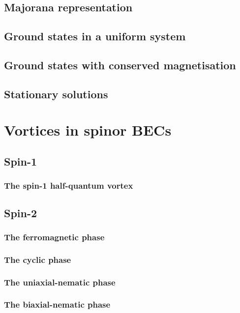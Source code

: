 \subsection{Majorana representation}

\subsection{Ground states in a uniform system}

\subsection{Ground states with conserved magnetisation}

\subsection{Stationary solutions}

\section{Vortices in spinor BECs}

\subsection{Spin-1}
\subsubsection{The spin-1 half-quantum vortex}

\subsection{Spin-2}

\subsubsection{The ferromagnetic phase}
\subsubsection{The cyclic phase}
\subsubsection{The uniaxial-nematic phase}
\subsubsection{The biaxial-nematic phase}

